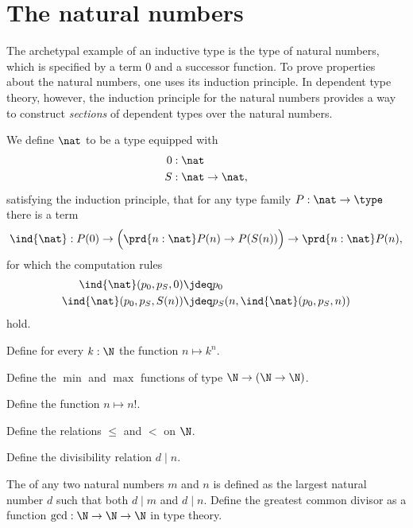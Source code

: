 \section{The natural numbers}
The archetypal example of an inductive type is the type of natural numbers, which is specified by a term $0$ and a successor function. To prove properties about the natural numbers, one uses its induction principle. In dependent type theory, however, the induction principle for the natural numbers provides a way to construct \emph{sections} of dependent types over the natural numbers. 

\begin{defn}
We define $\nat$ to be a type equipped with
\begin{align*}
0 & : \nat \\
S & : \nat \to\nat,
\end{align*}
satisfying the induction principle, that for any type family $P:\nat\to\type$ there is a term
\begin{equation*}
\ind{\nat}:P(0)\to \Big(\prd{n:\nat}P(n)\to P(S(n))\Big)\to \prd{n:\nat}P(n),
\end{equation*}
for which the computation rules
\begin{align*}
\ind{\nat}(p_0,p_S,0) & \jdeq p_0 \\
\ind{\nat}(p_0,p_S,S(n)) & \jdeq p_S(n,\ind{\nat}(p_0,p_S,n))
\end{align*}
hold.
\end{defn}

\begin{exercises}
\item Define for every $k:\N$ the function $n\mapsto k^n$. 
\item Define the $\min$ and $\max$ functions of type $\N\to(\N\to\N)$.
\item Define the function $n\mapsto n!$. 
\item Define the relations $\leq$ and $<$ on $\N$.
\item Define the divisibility relation $d\mid n$. 
\item The  of any two natural numbers $m$ and $n$ is defined as the largest natural number $d$ such that both $d\mid m$ and $d\mid n$. Define the greatest common divisor as a function $\mathrm{gcd}:\N\to\N\to\N$ in type theory.
\end{exercises}
